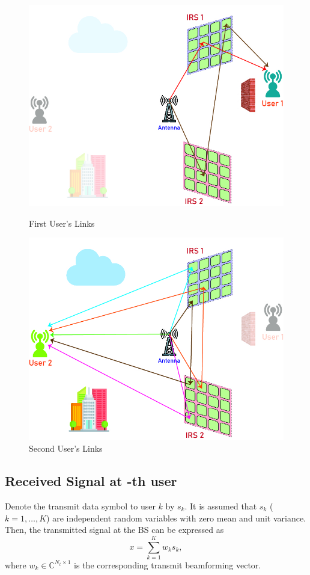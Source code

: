 \documentclass{article}
\begin{document}
\begin{figure}[!h]
	\centering
	\begin{minipage}{.5\textwidth}
		\flushleft		
		\includegraphics[width=0.9\linewidth]{with_obstacle__user1}
		\caption{First User's Links}
	\end{minipage}%
	\vline
	\begin{minipage}{.5\textwidth}
		\flushright
		\includegraphics[width=0.9\linewidth]{with_obstacle__user2}
		\caption{Second User's Links}
	\end{minipage}
\end{figure}

\subsection{Received Signal at -th user}
Denote the transmit data symbol to user $k$ by $s_k$. It is assumed that $s_k$ ($k = 1, \ldots, K$) are independent random variables with zero mean and unit variance. Then, the transmitted signal at the BS can be expressed as
\begin{equation}
	x = \sum_{k=1}^{K} w_k s_k, \label{eq:transmitted_signal}
\end{equation}
where $w_k \in \mathbb{C}^{N_t \times 1}$ is the corresponding transmit beamforming vector.
\end{document}
